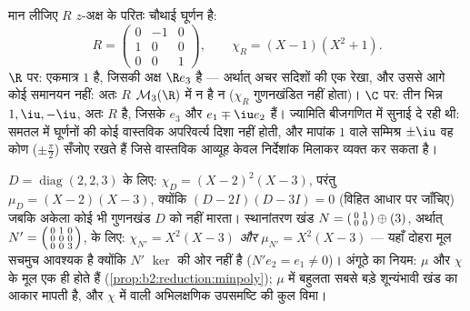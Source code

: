 \begin{example}[क्षेत्र निर्णय करता है: $\R^3$ में एक घूर्णन]\label{ex:b2:reduction:rotation3d}
मान लीजिए $R$ $z$-अक्ष के परितः चौथाई घूर्णन है:
\[
R = \begin{pmatrix}
0 & -1 & 0\\
1 & 0 & 0\\
0 & 0 & 1
\end{pmatrix},
\qquad
\chi_R = (X - 1)(X^2 + 1).
\]
$\R$ पर: एकमात्र  $1$ है, जिसकी  अक्ष $\R e_3$
है --- अर्थात् अचर सदिशों की एक रेखा, और उससे आगे कोई समानयन नहीं: अतः
$R$ $\mathcal{M}_3(\R)$ में न  है न  ($\chi_R$ गुणनखंडित नहीं होता)।
$\C$ पर: तीन भिन्न  $1, \iu, -\iu$, अतः $R$  है, जिसके
 $e_3$ और $e_1 \mp \iu e_2$ हैं। ज्यामिति बीजगणित में सुनाई दे रही
थी: समतल में घूर्णनों की कोई वास्तविक अपरिवर्त्य दिशा नहीं होती, और
मापांक $1$ वाले सम्मिश्र  $\pm\iu$ वह कोण ($\pm\frac\pi2$) सँजोए
रखते हैं जिसे वास्तविक आव्यूह केवल निर्देशांक मिलाकर व्यक्त कर सकता है।
\end{example}

\begin{example}[न्यूनतम बनाम अभिलक्षणिक]\label{ex:b2:reduction:minvschar}
$D = \operatorname{diag}(2, 2, 3)$ के लिए: $\chi_D = (X - 2)^2(X -
3)$, परंतु $\mu_D = (X - 2)(X - 3)$, क्योंकि $(D - 2I)(D - 3I) = 0$ (विहित आधार पर जाँचिए) जबकि
अकेला कोई भी गुणनखंड $D$ को नहीं मारता। स्थानांतरण खंड $N = \begin{psmallmatrix}0 & 1\\ 0 &
0\end{psmallmatrix} \oplus (3)$, अर्थात्
$N' =
\begin{psmallmatrix}0 & 1 & 0\\ 0 & 0 & 0\\ 0 & 0 &
3\end{psmallmatrix}$, के लिए: $\chi_{N'} = X^2(X - 3)$ \emph{और} $\mu_{N'} = X^2(X - 3)$ --- यहाँ दोहरा मूल सचमुच आवश्यक है
क्योंकि $N'$ $\ker$ की ओर  नहीं है ($N'e_2 =
e_1 \neq 0$)। अंगूठे का नियम: $\mu$
और $\chi$ के मूल एक ही होते हैं (\cref{prop:b2:reduction:minpoly}); $\mu$ में बहुलता सबसे बड़े
शून्यंभावी खंड का आकार मापती है, और $\chi$ में वाली अभिलक्षणिक उपसमष्टि
की कुल विमा।
\end{example}

